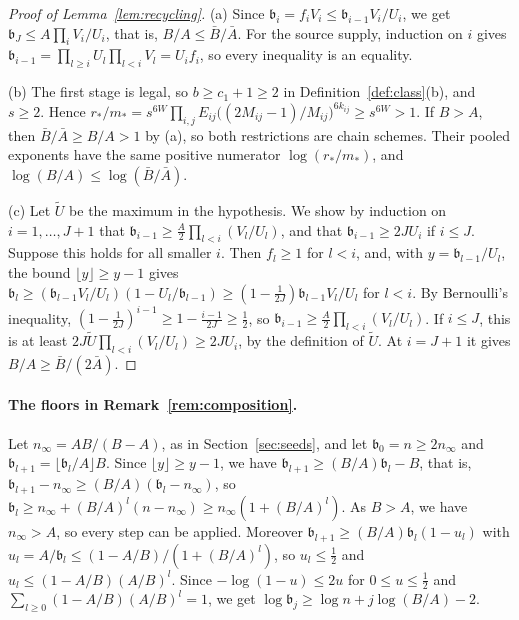 \begin{proof}[Proof of Lemma~\ref{lem:recycling}]
(a) Since \(\mathfrak b_i=f_iV_i\le\mathfrak b_{i-1}V_i/U_i\), we get
\(\mathfrak b_J\le A\prod_iV_i/U_i\), that is, \(B/A\le\bar B/\bar A\). For the
source supply, induction on \(i\) gives
\(\mathfrak b_{i-1}=\prod_{l\ge i}U_l\prod_{l<i}V_l=U_if_i\), so every
inequality is an equality.

(b) The first stage is legal, so \(b\ge c_1+1\ge2\) in
Definition~\ref{def:class}(b), and \(s\ge2\). Hence
\(r_*/m_*=s^{6W}\prod_{i,j}E_{ij}\bigl((2M_{ij}-1)/M_{ij}\bigr)^{6k_{ij}}\ge s^{6W}>1\).
If \(B>A\), then \(\bar B/\bar A\ge B/A>1\) by (a), so both restrictions
are chain schemes. Their pooled exponents have the same positive
numerator \(\log(r_*/m_*)\), and \(\log(B/A)\le\log(\bar B/\bar A)\).

(c) Let \(\tilde U\) be the maximum in the hypothesis. We show by
induction on \(i=1,\ldots,J+1\) that
\(\mathfrak b_{i-1}\ge\frac A2\prod_{l<i}(V_l/U_l)\), and that
\(\mathfrak b_{i-1}\ge2JU_i\) if \(i\le J\). Suppose this holds for all
smaller \(i\). Then \(f_l\ge1\) for \(l<i\), and, with
\(y=\mathfrak b_{l-1}/U_l\), the bound \(\lfloor y\rfloor\ge y-1\) gives
\(\mathfrak b_l\ge(\mathfrak b_{l-1}V_l/U_l)(1-U_l/\mathfrak b_{l-1})
\ge(1-\frac1{2J})\mathfrak b_{l-1}V_l/U_l\) for \(l<i\).
By Bernoulli's inequality,
\((1-\frac1{2J})^{i-1}\ge1-\frac{i-1}{2J}\ge\frac12\), so
\(\mathfrak b_{i-1}\ge\frac A2\prod_{l<i}(V_l/U_l)\). If \(i\le J\), this is
at least \(2J\tilde U\prod_{l<i}(V_l/U_l)\ge2JU_i\), by the definition of
\(\tilde U\). At \(i=J+1\) it gives \(B/A\ge\bar B/(2\bar A)\).
\end{proof}

\paragraph{The floors in Remark~\ref{rem:composition}.}
Let \(n_\infty=AB/(B-A)\), as in Section~\ref{sec:seeds}, and let
\(\mathfrak b_0=n\ge2n_\infty\) and
\(\mathfrak b_{l+1}=\lfloor\mathfrak b_l/A\rfloor B\). Since
\(\lfloor y\rfloor\ge y-1\), we have
\(\mathfrak b_{l+1}\ge(B/A)\mathfrak b_l-B\), that is,
\(\mathfrak b_{l+1}-n_\infty\ge(B/A)(\mathfrak b_l-n_\infty)\), so
\(\mathfrak b_l\ge n_\infty+(B/A)^l(n-n_\infty)\ge n_\infty(1+(B/A)^l)\).
As \(B>A\), we have \(n_\infty>A\), so every step can be applied. Moreover
\(\mathfrak b_{l+1}\ge(B/A)\mathfrak b_l(1-u_l)\) with
\(u_l=A/\mathfrak b_l\le(1-A/B)/(1+(B/A)^l)\), so \(u_l\le\frac12\)
and \(u_l\le(1-A/B)(A/B)^l\). Since \(-\log(1-u)\le2u\) for
\(0\le u\le\frac12\) and \(\sum_{l\ge0}(1-A/B)(A/B)^l=1\), we
get \(\log\mathfrak b_j\ge\log n+j\log(B/A)-2\).

